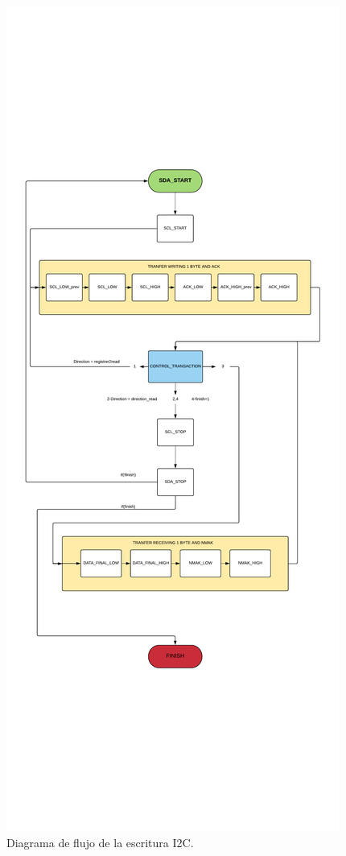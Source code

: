 \begin{figure}[H]
	\center
	\includegraphics[trim = 0mm 6cm 0mm 6cm, clip,scale=0.5]{imagenes/Cuadricoptero_vision/I2C_WRITE.pdf}
	\caption{Diagrama de flujo de la escritura I2C.}
	\label{fig:i2c_write}
\end{figure}

